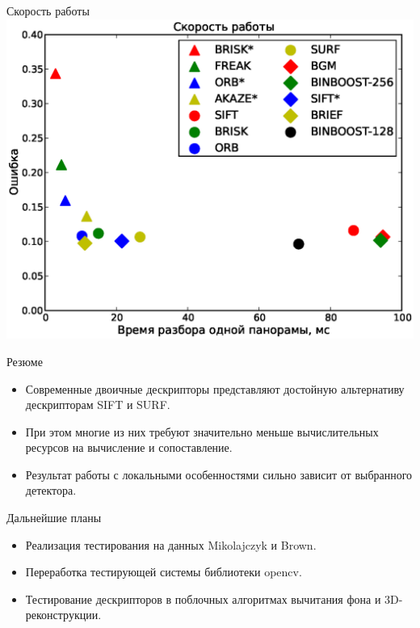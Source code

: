 \documentclass[14pt,mathserif,aspectratio=43]{beamer}
\begin{document}
\begin{frame}{Скорость работы}
	\includegraphics[width=\linewidth]{speed.eps}
\end{frame}

\begin{frame}{Резюме}
	\begin{itemize}
        \item Современные двоичные дескрипторы представляют достойную альтернативу дескрипторам SIFT и SURF.
        \pause
        \item При этом многие из них требуют значительно меньше вычислительных ресурсов на вычисление и сопоставление.
        \pause
        \item Результат работы с локальными особенностями сильно зависит от выбранного детектора.
    \end{itemize}
\end{frame}

\begin{frame}{Дальнейшие планы}
	\begin{itemize}
        \item Реализация тестирования на данных Mikolajczyk и Brown.
        \pause
        \item Переработка тестирующей системы библиотеки opencv.
        \pause
        \item Тестирование дескрипторов в поблочных алгоритмах вычитания фона и 3D-реконструкции.
    \end{itemize}
\end{frame}
\end{document}
